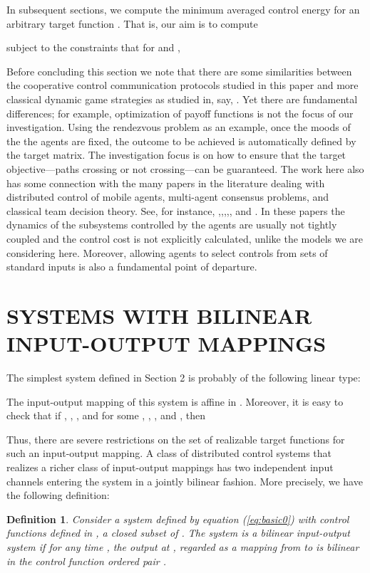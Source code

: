 \documentclass[12pt,onecolumn,draftcls]{IEEEtran}
\newtheorem{definition}{Definition}[section]
\begin{document}
In subsequent sections, we compute the minimum averaged control energy for an arbitrary target function .
That is, our aim is to compute

subject to the constraints that for  and ,


Before concluding this section we note that there are some similarities between the cooperative control communication protocols studied in this paper and more classical dynamic game strategies as studied in, say,  \cite{BO}.  Yet there are fundamental differences; for example, optimization of payoff functions is not the focus of our investigation.
Using the rendezvous problem as an example, once the moods of the the agents are fixed, the outcome to be achieved is
automatically defined by the target matrix.  The investigation focus is on how to ensure that the target objective---paths crossing or not crossing---can be guaranteed.  The work here also has some connection with the many papers in the literature
dealing with distributed control of mobile agents, multi-agent  consensus problems, and classical team decision theory.  See,  for instance,
 \cite{CB},\cite{CMB},\cite{DM},\cite{FM},\cite{YCHo}, and \cite{OM}.  In these papers the dynamics of the subsystems controlled by the agents are usually not tightly coupled
and the control cost is not explicitly calculated, unlike the models we are considering here.  Moreover, allowing agents to select controls from sets of standard inputs is also a fundamental point of departure.

\section{SYSTEMS WITH BILINEAR INPUT-OUTPUT MAPPINGS}\setcounter{equation}{0}
The simplest system defined in Section 2 is probably of the following linear type:

The input-output mapping of this system is affine in .
Moreover, it is easy to check that
if ,
, , and
 for some , , , and , then

Thus, there are severe restrictions on the set of realizable target functions for such an input-output mapping.  
A class of distributed control systems that realizes a richer class of input-output mappings has two independent input channels entering the system in a jointly bilinear fashion.  More precisely, we have the following definition:
\begin{definition}
Consider a system defined by equation (\ref{eq:basic0}) with control functions
defined in , a closed subset of .  The system
is a {\em bilinear input-output system} if for any time , the output at , regarded as a mapping
 from
 to  is bilinear in the control function ordered pair .
\end{definition}
\end{document}
